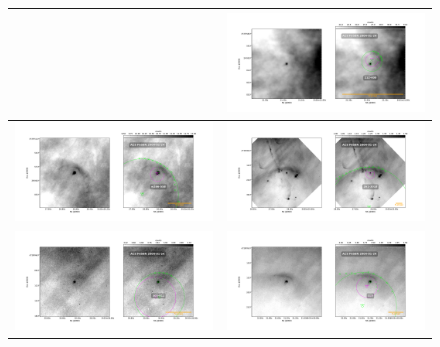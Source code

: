 \begin{figure}[htp]
\begin{tabular}{|l|l|}
    &\includegraphics[width=0.47\linewidth,  trim=60 50 100 50, clip]{j8oc06010_wcs/212-400-Bally_06-images.pdf}\\ \hline
    \includegraphics[width=0.47\linewidth,  trim=60 50 100 50, clip]{j8oc06010_wcs/w266-558-Bally_06-images.pdf}
    &\includegraphics[width=0.47\linewidth,  trim=60 50 100 50, clip]{j8oc07010_wcs/261-3018-Bally_07-images.pdf}\\ \hline
    \includegraphics[width=0.47\linewidth,  trim=60 50 100 50, clip]{j8oc07010_wcs/305-811-Bally_07-images.pdf}
    &\includegraphics[width=0.47\linewidth,  trim=60 50 100 50, clip]{j8oc07010_wcs/LL5-Bally_07-images.pdf}\\ \hline
\end{tabular}
\end{figure}

